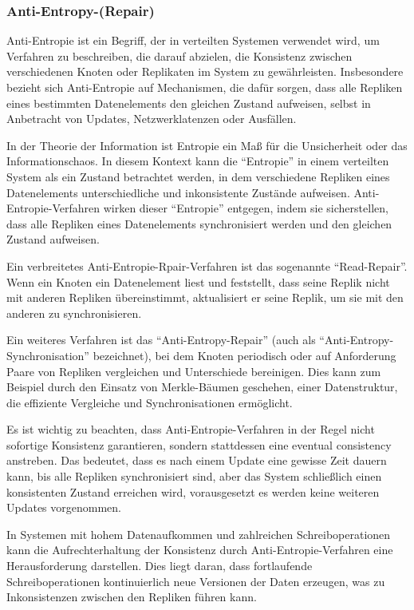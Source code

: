 \documentclass[../vs-script-first-v01.tex]{subfiles}
\begin{document}
\subsubsection{Anti-Entropy-(Repair)}
Anti-Entropie ist ein Begriff, der in verteilten Systemen verwendet wird, um Verfahren zu beschreiben, die darauf abzielen, die Konsistenz zwischen verschiedenen Knoten oder Replikaten im System zu gewährleisten. Insbesondere bezieht sich Anti-Entropie auf Mechanismen, die dafür sorgen, dass alle Repliken eines bestimmten Datenelements den gleichen Zustand aufweisen, selbst in Anbetracht von Updates, Netzwerklatenzen oder Ausfällen.

In der Theorie der Information ist Entropie ein Maß für die Unsicherheit oder das Informationschaos. In diesem Kontext kann die \enquote{Entropie} in einem verteilten System als ein Zustand betrachtet werden, in dem verschiedene Repliken eines Datenelements unterschiedliche und inkonsistente Zustände aufweisen. Anti-Entropie-Verfahren wirken dieser \enquote{Entropie} entgegen, indem sie sicherstellen, dass alle Repliken eines Datenelements synchronisiert werden und den gleichen Zustand aufweisen.

Ein verbreitetes Anti-Entropie-Rpair-Verfahren ist das sogenannte \enquote{Read-Repair}. Wenn ein Knoten ein Datenelement liest und feststellt, dass seine Replik nicht mit anderen Repliken übereinstimmt, aktualisiert er seine Replik, um sie mit den anderen zu synchronisieren.

Ein weiteres Verfahren ist das \enquote{Anti-Entropy-Repair} (auch als \enquote{Anti-Entropy-Synchronisation} bezeichnet), bei dem Knoten periodisch oder auf Anforderung Paare von Repliken vergleichen und Unterschiede bereinigen. Dies kann zum Beispiel durch den Einsatz von Merkle-Bäumen geschehen, einer Datenstruktur, die effiziente Vergleiche und Synchronisationen ermöglicht.

Es ist wichtig zu beachten, dass Anti-Entropie-Verfahren in der Regel nicht sofortige Konsistenz garantieren, sondern stattdessen eine eventual consistency anstreben. Das bedeutet, dass es nach einem Update eine gewisse Zeit dauern kann, bis alle Repliken synchronisiert sind, aber das System schließlich einen konsistenten Zustand erreichen wird, vorausgesetzt es werden keine weiteren Updates vorgenommen.

In Systemen mit hohem Datenaufkommen und zahlreichen Schreiboperationen kann die Aufrechterhaltung der Konsistenz durch Anti-Entropie-Verfahren eine Herausforderung darstellen. Dies liegt daran, dass fortlaufende Schreiboperationen kontinuierlich neue Versionen der Daten erzeugen, was zu Inkonsistenzen zwischen den Repliken führen kann.
\end{document}
